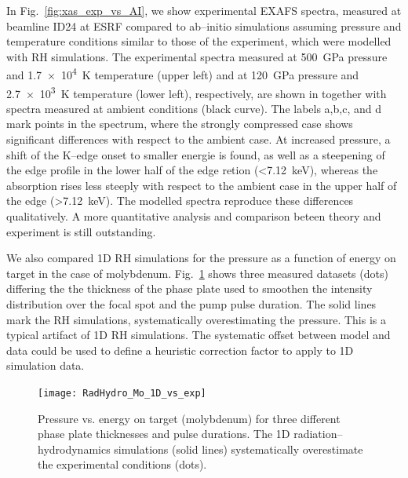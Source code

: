 \documentclass[10pt]{scrartcl}
\begin{document}
%
In Fig.~\ref{fig:xas_exp_vs_AI}, we show experimental EXAFS
spectra, measured at beamline ID24 at ESRF \cite{Torchio2016} compared to ab--initio
simulations assuming pressure and temperature conditions similar to those of
the experiment, which were modelled with RH simulations. The experimental spectra
measured at \SI{500}{\giga\pascal} pressure and \SI{1.7e4}{\kelvin} temperature
(upper left) and at \SI{120}{\giga\pascal} pressure and \SI{2.7e3}{\kelvin}
temperature (lower left), respectively, are shown in together with spectra
measured at ambient conditions (black curve). The labels a,b,c, and d mark points
in the spectrum, where the strongly compressed case shows significant
differences with respect to the ambient case. At increased pressure, a shift of
the K--edge onset to smaller energie is found, as well as a steepening of the
edge profile in the lower half of the edge retion
(\SI{<7.12}{\kilo\electronvolt}), whereas the absorption rises less steeply with respect to the
ambient case in the upper half of the edge (\SI{>7.12}{\kilo\electronvolt}).
The modelled spectra reproduce
these differences qualitatively. A more quantitative analysis and comparison
beteen theory and experiment is still outstanding.
%

We also compared 1D RH simulations for the pressure as a function
of energy on target in the case of molybdenum. Fig.~\ref{fig:rh_1d_vs_exp}
shows three measured datasets (dots) differing the the thickness of the phase plate
used to smoothen the intensity distribution over the focal spot and the pump
pulse duration. The solid lines mark the RH simulations, systematically
overestimating the pressure. This is a typical artifact of 1D RH simulations.
The systematic offset between model and data could be used to define a heuristic
correction factor to apply to 1D simulation data.
%
\begin{figure}[ht]
  \begin{center}
    \texttt{[image: RadHydro\_Mo\_1D\_vs\_exp]}
  \end{center}
  \caption{Pressure vs. energy on target (molybdenum) for three different phase plate
  thicknesses and pulse durations. The 1D radiation--hydrodynamics simulations
  (solid lines) systematically overestimate the experimental conditions (dots).}
  \label{fig:rh_1d_vs_exp}
\end{figure}
%
\end{document}
